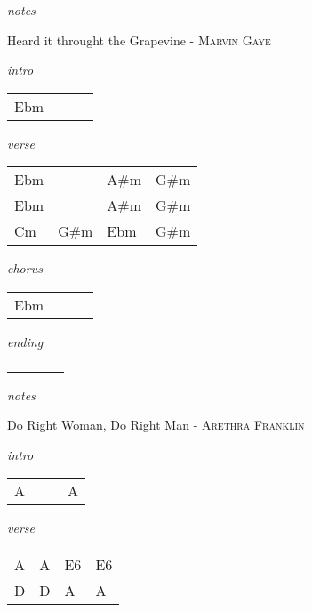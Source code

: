 \documentclass[12pt]{article}
\begin{document}
\textit{notes}

\newpage

{\Huge Heard it throught the Grapevine} {\huge - \textsc{Marvin Gaye}}

\huge
\textit{intro}

\begin{tabular}{|P{1.25in}|P{1.25in}|P{1.25in}|P{1.25in}|}
  Ebm &   &   &   \\
\end{tabular}

\textit{verse}

\begin{tabular}{|P{1.25in}|P{1.25in}|P{1.25in}|P{1.25in}|}
  Ebm &   & A\#m  & G\#m  \\
  Ebm &   & A\#m  & G\#m  \\
  Cm  &  G\#m & Ebm & G\#m \\
\end{tabular}

\textit{chorus}

\begin{tabular}{|P{1.25in}|P{1.25in}|P{1.25in}|P{1.25in}|}
  Ebm &   &   &   \\
\end{tabular}

\textit{ending}

\begin{tabular}{|P{1.25in}|P{1.25in}|P{1.25in}|P{1.25in}|}
   &   &   &   \\
\end{tabular}

\textit{notes}

\newpage

{\Huge Do Right Woman, Do Right Man} {\huge - \textsc{Arethra Franklin}}

\huge
\textit{intro}

\begin{tabular}{|P{1.25in}|P{1.25in}|P{1.25in}|P{1.25in}|}
  A &   &   &  A \\

\end{tabular}

\textit{verse}

\begin{tabular}{|P{1.25in}|P{1.25in}|P{1.25in}|P{1.25in}|}
  A & A  &  E6 &  E6 \\
  D & D  &  A &  A \\
\end{tabular}
\end{document}
